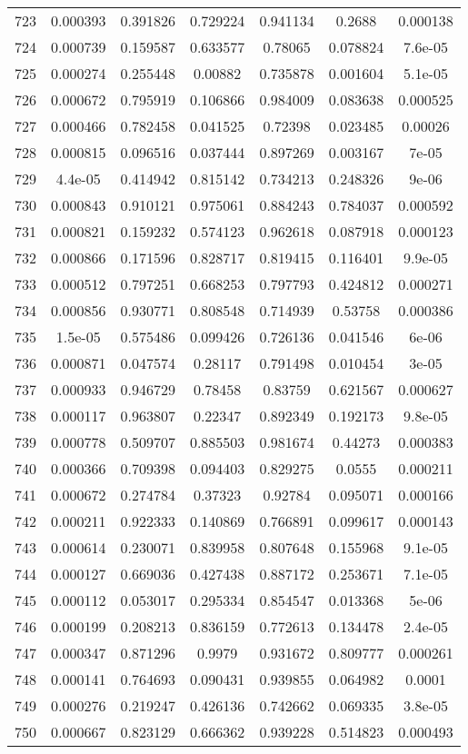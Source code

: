 \begin{table}
\begin{tabular}{c|c|c|c|c|c|c}
723 & 0.000393 & 0.391826 & 0.729224 & 0.941134 & 0.2688 & 0.000138\\
724 & 0.000739 & 0.159587 & 0.633577 & 0.78065 & 0.078824 & 7.6e-05\\
725 & 0.000274 & 0.255448 & 0.00882 & 0.735878 & 0.001604 & 5.1e-05\\
726 & 0.000672 & 0.795919 & 0.106866 & 0.984009 & 0.083638 & 0.000525\\
727 & 0.000466 & 0.782458 & 0.041525 & 0.72398 & 0.023485 & 0.00026\\
728 & 0.000815 & 0.096516 & 0.037444 & 0.897269 & 0.003167 & 7e-05\\
729 & 4.4e-05 & 0.414942 & 0.815142 & 0.734213 & 0.248326 & 9e-06\\
730 & 0.000843 & 0.910121 & 0.975061 & 0.884243 & 0.784037 & 0.000592\\
731 & 0.000821 & 0.159232 & 0.574123 & 0.962618 & 0.087918 & 0.000123\\
732 & 0.000866 & 0.171596 & 0.828717 & 0.819415 & 0.116401 & 9.9e-05\\
733 & 0.000512 & 0.797251 & 0.668253 & 0.797793 & 0.424812 & 0.000271\\
734 & 0.000856 & 0.930771 & 0.808548 & 0.714939 & 0.53758 & 0.000386\\
735 & 1.5e-05 & 0.575486 & 0.099426 & 0.726136 & 0.041546 & 6e-06\\
736 & 0.000871 & 0.047574 & 0.28117 & 0.791498 & 0.010454 & 3e-05\\
737 & 0.000933 & 0.946729 & 0.78458 & 0.83759 & 0.621567 & 0.000627\\
738 & 0.000117 & 0.963807 & 0.22347 & 0.892349 & 0.192173 & 9.8e-05\\
739 & 0.000778 & 0.509707 & 0.885503 & 0.981674 & 0.44273 & 0.000383\\
740 & 0.000366 & 0.709398 & 0.094403 & 0.829275 & 0.0555 & 0.000211\\
741 & 0.000672 & 0.274784 & 0.37323 & 0.92784 & 0.095071 & 0.000166\\
742 & 0.000211 & 0.922333 & 0.140869 & 0.766891 & 0.099617 & 0.000143\\
743 & 0.000614 & 0.230071 & 0.839958 & 0.807648 & 0.155968 & 9.1e-05\\
744 & 0.000127 & 0.669036 & 0.427438 & 0.887172 & 0.253671 & 7.1e-05\\
745 & 0.000112 & 0.053017 & 0.295334 & 0.854547 & 0.013368 & 5e-06\\
746 & 0.000199 & 0.208213 & 0.836159 & 0.772613 & 0.134478 & 2.4e-05\\
747 & 0.000347 & 0.871296 & 0.9979 & 0.931672 & 0.809777 & 0.000261\\
748 & 0.000141 & 0.764693 & 0.090431 & 0.939855 & 0.064982 & 0.0001\\
749 & 0.000276 & 0.219247 & 0.426136 & 0.742662 & 0.069335 & 3.8e-05\\
750 & 0.000667 & 0.823129 & 0.666362 & 0.939228 & 0.514823 & 0.000493\\
\end{tabular}
\end{table}

